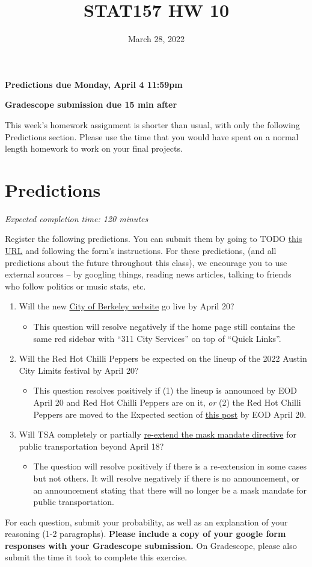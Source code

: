 \documentclass[11pt]{article}
\title{STAT157 HW 10}
\date{March 28, 2022}
\begin{document}
\maketitle

\hfill \textbf{Predictions due Monday, April 4 11:59pm}

\hfill \textbf{Gradescope submission due 15 min after}


This week's homework assignment is shorter than usual, with only the following Predictions section. Please use the time that you would have spent on a normal length homework to work on your final projects.


\section*{Predictions}

\emph{Expected completion time: 120 minutes}

Register the following predictions. You can submit them by going to TODO \href{TODO}{this URL} and following the form's instructions. For these predictions, (and all predictions about the future throughout this class), we encourage you to use external sources -- by googling things, reading news articles, talking to friends who follow politics or music stats, etc.

\begin{enumerate}
	\item Will the new \href{https://www.cityofberkeley.info/Home.aspx}{City of Berkeley website} go live by April 20?
	\begin{itemize}
		\item This question will resolve negatively if the home page still contains the same red sidebar with ``311 City Services'' on top of ``Quick Links''.
	\end{itemize} 
	\item Will the Red Hot Chilli Peppers be expected on the lineup of the 2022 Austin City Limits festival by April 20?
	\begin{itemize}
		\item This question resolves positively if (1) the lineup is announced by EOD April 20 and Red Hot Chilli Peppers are on it, \emph{or} (2) the Red Hot Chilli Peppers are moved to the Expected section of \href{https://www.reddit.com/r/aclfestival/comments/s6izhl/official_acl_2022_lineup_speculation_thread/}{this post} by EOD April 20.
	\end{itemize}
	\item Will TSA completely or partially \href{https://www.tsa.gov/news/press/statements/2022/03/10/statement-regarding-face-mask-use-public-transportation}{re-extend the mask mandate directive} for public transportation beyond April 18?
	\begin{itemize}
		\item The question will resolve positively if there is a re-extension in some cases but not others. It will resolve negatively if there is no announcement, or an announcement stating that there will no longer be a mask mandate for public transportation.
	\end{itemize}
\end{enumerate}

For each question, submit your probability, as well as an explanation of your reasoning (1-2 paragraphs). \textbf{Please include a copy of your google form responses with your Gradescope submission.} On Gradescope, please also submit the time it took to complete this exercise.
\end{document}
